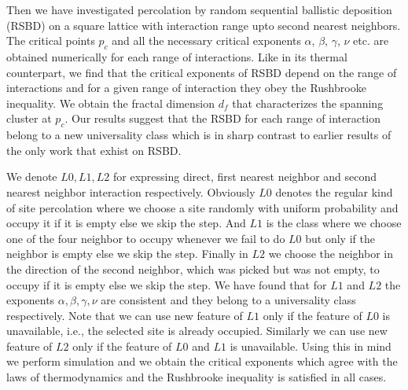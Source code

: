  Then we have investigated percolation by random sequential ballistic deposition (RSBD) on a square lattice with interaction range upto second nearest neighbors. The critical points $p_c$ and all the necessary critical exponents $\alpha$, $\beta$, $\gamma$, $\nu$ etc. are obtained numerically for each range of interactions. Like  in its thermal counterpart, we find that the critical exponents of RSBD depend on the range of interactions and for a given range of interaction they obey the Rushbrooke inequality. We obtain  the fractal dimension $d_f$ that characterizes the spanning cluster at $p_c$. Our results suggest that the RSBD for each range of interaction belong to a new universality class which is in sharp contrast to earlier results of the only work that exhist on RSBD.
 

We denote $L0,L1,L2$ for expressing direct, first nearest neighbor and second nearest neighbor interaction respectively. Obviously $L0$ denotes the regular kind of site percolation where we choose a site randomly with uniform probability and occupy it if it is empty else we skip the step. And $L1$ is the class where we choose one of the four neighbor to occupy whenever we fail to do $L0$ but only if the neighbor is empty else we skip the step. Finally in $L2$ we choose the neighbor in the direction of the second neighbor, which was picked but was not empty, to occupy if it is empty else we skip the step. We have found that for $L1$ and $L2$ the exponents $\alpha, \beta, \gamma, \nu$ are consistent and they belong to a universality class respectively. 
Note that  we can use new feature of $L1$ only if the feature of $L0$ is unavailable, i.e., the selected site is already occupied. Similarly we can use new feature of $L2$ only if the feature of $L0$ and $L1$ is unavailable. Using this in mind we perform simulation and we obtain the critical exponents which agree with the laws of thermodynamics and the Rushbrooke inequality is satisfied in all cases.

\clearpage
\newpage
